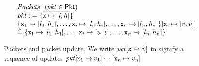 

\begin{figure}[tpb]
  \[\begin{array}{l}
      \mathit{Packets}~~(\mathit{pkt} \in \mathsf{Pkt}) \\
      \mathit{pkt} :: =\{\overline{\texttt{x} \mapsto [l,h]}\}\\
      \{\texttt{x}_1\mapsto [l_1,h_1], \ldots, \texttt{x}_i \mapsto [l_i,h_i], \ldots, \texttt{x}_n \mapsto [l_n,h_n]\}[\texttt{x}_i \mapsto [u,v]]
      \\ \triangleq
      \{\texttt{x}_1 \mapsto [l_1,h_1], \ldots, \texttt{x}_i \mapsto [u,v], \ldots, \texttt{x}_n\mapsto [l_n,h_n]\}
    \end{array}
  \]
  \caption{Packets and packet update. We write
    $\mathit{pkt}[\overline{\texttt{x} \mapsto v}]$ to signify a sequence of
  updates $\mathit{pkt}[\texttt{x}_1 \mapsto v_1]\cdots[\texttt{x}_n \mapsto v_n]$}
  \label{fig:packets}
\end{figure}
